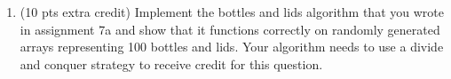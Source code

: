 \documentclass[12pt]{article}
\theoremstyle{remark}
\newtheorem*{solution}{Solution}
\begin{document}
\begin{enumerate}
\begin{enumerate}
\begin{solution}
\end{solution}

\item (5 pts) Write a recurrence relation for the worst case running time of QuickSort with this pivoting strategy.\\
\begin{solution}

\end{solution}
\end{enumerate}

\item (10 pts extra credit) Implement the bottles and lids algorithm that you wrote in assignment 7a and show that it functions correctly on randomly generated arrays representing 100 bottles and lids. Your algorithm needs to use a divide and conquer strategy to receive credit for this question.


    
\end{enumerate}
\end{document}
